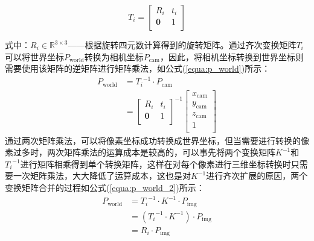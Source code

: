 \begin{equation}
    \label{equa:T_i}
    T_i = \begin{bmatrix}
        R_i & t_i \\
        \mathbf{0} & 1\\
    \end{bmatrix}
\end{equation}

式中：${R_i}\in \mathbb{R}^{3\times 3}$——根据旋转四元数计算得到的旋转矩阵。通过齐次变换矩阵$T_i$可以将世界坐标$P_\text{world}$转换为相机坐标$P_\text{cam}$，因此，将相机坐标转换到世界坐标则需要使用该矩阵的逆矩阵进行矩阵乘法，如公式(\ref{equa:p_world})所示：
\begin{equation}
    \label{equa:p_world}
    \begin{aligned}
    P_\text{world} &= {T_i}^{-1}\cdot P_\text{cam} \\
              &= {\begin{bmatrix}
                R_i & t_i \\
                \mathbf{0} & 1\\
              \end{bmatrix}} ^{-1}
              \begin{bmatrix}
                x_\text{cam} \\
                y_\text{cam} \\
                z_\text{cam} \\
                1       \\
              \end{bmatrix}
    \end{aligned}
\end{equation}
通过两次矩阵乘法，可以将像素坐标成功转换成世界坐标，但当需要进行转换的像素过多时，两次矩阵乘法的运算成本是较高的，可以事先将两个变换矩阵$K^{-1}$和${T_i}^{-1}$进行矩阵相乘得到单个转换矩阵，这样在对每个像素进行三维坐标转换时只需要一次矩阵乘法，大大降低了运算成本，这也是对$K^{-1}$进行齐次扩展的原因，两个变换矩阵合并的过程如公式(\ref{equa:p_world_2})所示：
\begin{equation}
    \label{equa:p_world_2}
    \begin{aligned}
        P_\text{world} &= {T_i}^{-1}\cdot K^{-1}\cdot P_\text{img}    \\
                  &= \left({T_i}^{-1}\cdot K^{-1}\right)\cdot P_\text{img} \\
                  &= {R_i} \cdot P_\text{img}                     \\
    \end{aligned}
\end{equation}
